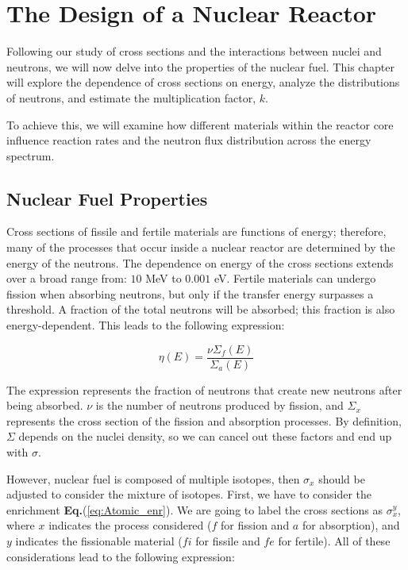 \chapter{The Design of a Nuclear Reactor}
Following our study of cross sections and the interactions between nuclei and neutrons, we will now delve into the properties of the nuclear fuel. This chapter will explore the dependence of cross sections on energy, analyze the distributions of neutrons, and estimate the multiplication factor, \( k \).

To achieve this, we will examine how different materials within the reactor core influence reaction rates and the neutron flux distribution across the energy spectrum.


\section{Nuclear Fuel Properties}

Cross sections of fissile and fertile materials are functions of energy; therefore, many of the processes that occur inside a nuclear reactor are determined by the energy of the neutrons. The dependence on energy of the cross sections extends over a broad range from: \(10\) MeV to \(0.001\) eV. Fertile materials can undergo fission when absorbing neutrons, but only if the transfer energy surpasses a threshold. A fraction of the total neutrons will be absorbed; this fraction is also energy-dependent. This leads to the following expression:

\begin{equation}
    \eta (E) = \frac{\nu \Sigma_{f}(E)}{\Sigma_{a}(E)}
    \label{eq:first_eta_def}
\end{equation}

The expression represents the fraction of neutrons that create new neutrons after being absorbed. $\nu$ is the number of neutrons produced by fission, and $\Sigma_{x}$ represents the cross section of the fission and absorption processes. By definition, $\Sigma$ depends on the nuclei density, so we can cancel out these factors and end up with $\sigma$.

However, nuclear fuel is composed of multiple isotopes, then $\sigma_{x}$ should be adjusted to consider the mixture of isotopes. First, we have to consider the enrichment \textbf{Eq.}(\ref{eq:Atomic_enr}). We are going to label the cross sections as $\sigma_{x}^{y}$, where \(x\) indicates the process considered (\(f\) for fission and \(a\) for absorption), and \(y\) indicates the fissionable material (\(fi\) for fissile and \(fe\) for fertile). All of these considerations lead to the following expression:

